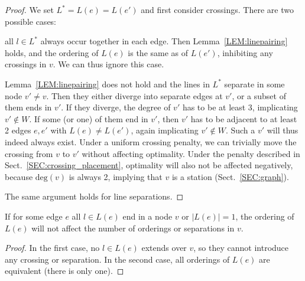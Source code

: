 \documentclass[sigconf]{acmart}
\begin{document}
\begin{proof}
We set $L^* = L(e) = L(e')$ and first consider crossings. There are two possible cases:
\begin{enumerate*}
	\item all $l \in L^*$ always occur together in each edge. Then Lemma~\ref{LEM:linepairing} holds, and the ordering of $L(e)$ is the same as of $L(e')$, inhibiting any crossings in $v$. We can thus ignore this case.
	\item Lemma~\ref{LEM:linepairing} does not hold and the lines in $L^*$ separate in some node $v' \neq v$. Then they either diverge into separate edges at $v'$, or a subset of them ends in $v'$. If they diverge, the degree of $v'$ has to be at least 3, implicating $v' \not\in W$. If some (or one) of them end in $v'$, then $v'$ has to be adjacent to at least 2 edges $e, e'$ with $L(e) \neq L(e')$, again implicating $v' \not\in W$. Such a $v'$ will thus indeed always exist. Under a uniform crossing penalty, we can trivially move the crossing from $v$ to $v'$ without affecting optimality. Under the penalty described in Sect.~\ref{SEC:crossing_placement}, optimality will also not be affected negatively, because $\text{deg}(v)$ is always 2, implying that $v$ is a station (Sect.~\ref{SEC:graph}).
\end{enumerate*} The same argument holds for line separations.
\end{proof}
\begin{lemma}\label{LEM:termini}
If for some edge $e$ all $l \in L(e)$ end in a node $v$ or $|L(e)| = 1$, the ordering of $L(e)$ will not affect the number of orderings or separations in $v$.
\end{lemma}
\begin{proof}
In the first case, no $l \in L(e)$ extends over $v$, so they cannot introduce any crossing or separation. In the second case, all orderings of $L(e)$ are equivalent (there is only one).
\end{proof}
\end{document}
